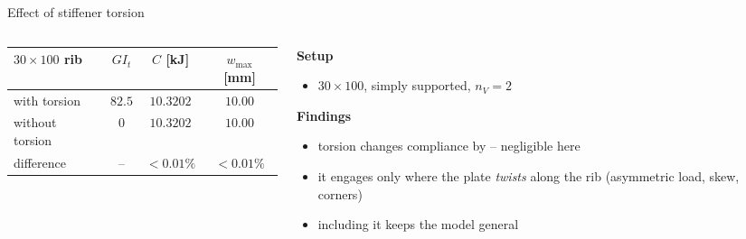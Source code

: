 \begin{frame}{Effect of stiffener torsion}
  \begin{columns}[c]
    \begin{column}{0.54\textwidth}
      \centering
      \renewcommand{\arraystretch}{1.3}
      \begin{tabular}{@{}lccc@{}}
        \toprule
        $30\times100$ rib & $GI_t$ & $C$ [kJ] & $w_{\max}$ [mm]\\
        \midrule
        with torsion    & $82.5$ & $10.3202$ & $10.00$\\
        without torsion & $0$    & $10.3202$ & $10.00$\\
        \midrule
        difference      & --     & $<0.01\%$ & $<0.01\%$\\
        \bottomrule
      \end{tabular}
    \end{column}
    \begin{column}{0.46\textwidth}
      \textbf{Setup}
      \begin{itemize}\footnotesize
        \item $30\times100$, simply supported, $n_V=2$
      \end{itemize}
      \textbf{Findings}
      \begin{itemize}\footnotesize
        \item torsion changes compliance by  --
              negligible here
        \item it engages only where the plate \emph{twists} along the rib
              (asymmetric load, skew, corners)
        \item including it keeps the model general
      \end{itemize}
    \end{column}
  \end{columns}
\end{frame}

